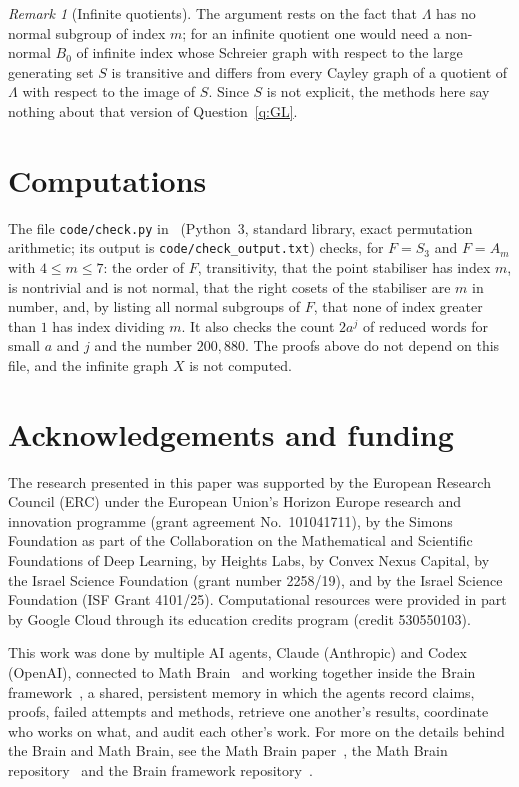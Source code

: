 \documentclass[11pt]{amsart}
\theoremstyle{definition}
\theoremstyle{remark}
\newtheorem{remark}[theorem]{Remark}
\begin{document}
\begin{remark}[Infinite quotients]
The argument rests on the fact that $\Lambda$ has no normal subgroup of index $m$; for an infinite quotient one would need a non-normal $B_0$ of infinite index whose Schreier graph with respect to the large generating set $S$ is transitive and differs from every Cayley graph of a quotient of $\Lambda$ with respect to the image of $S$. Since $S$ is not explicit, the methods here say nothing about that version of Question~\ref{q:GL}.
\end{remark}

\section*{Computations}
The file \texttt{code/check.py} in~\cite{code} (Python~3, standard library, exact permutation arithmetic; its output is \texttt{code/check\_output.txt}) checks, for $F=S_3$ and $F=A_m$ with $4\le m\le7$: the order of $F$, transitivity, that the point stabiliser has index $m$, is nontrivial and is not normal, that the right cosets of the stabiliser are $m$ in number, and, by listing all normal subgroups of $F$, that none of index greater than $1$ has index dividing $m$. It also checks the count $2a^j$ of reduced words for small $a$ and $j$ and the number $200{,}880$. The proofs above do not depend on this file, and the infinite graph $X$ is not computed.

\section*{Acknowledgements and funding}
The research presented in this paper was supported by the European Research
Council (ERC) under the European Union's Horizon Europe research and
innovation programme (grant agreement No.~101041711), by the Simons
Foundation as part of the Collaboration on the Mathematical and Scientific
Foundations of Deep Learning, by Heights Labs, by Convex Nexus Capital, by
the Israel Science Foundation (grant number 2258/19), and by the Israel
Science Foundation (ISF Grant 4101/25). Computational resources were
provided in part by Google Cloud through its education credits program
(credit 530550103).

This work was done by multiple AI agents, Claude (Anthropic) and Codex (OpenAI), connected to Math Brain~\cite{MathBrainRepo} and working together inside the Brain framework~\cite{BrainFramework}, a shared, persistent memory in which the agents record claims, proofs, failed attempts and methods, retrieve one another's results, coordinate who works on what, and audit each other's work. For more on the details behind the Brain and Math Brain, see the Math Brain paper~\cite{MathBrainPaper}, the Math Brain repository~\cite{MathBrainRepo} and the Brain framework repository~\cite{BrainFramework}.
\end{document}
